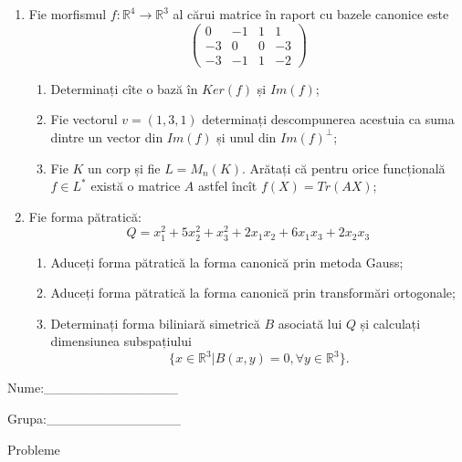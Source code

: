 \documentclass{article}
\begin{document}
\begin{enumerate}
 \item Fie morfismul $f:\mathbb{R}^4 \to \mathbb{R}^3$ al cărui matrice în raport cu bazele canonice este
$$\begin{pmatrix}
0&-1&1&1\\
-3&0&0&-3\\
-3&-1&1&-2
\end{pmatrix}$$

\begin{enumerate}
\item Determinați cîte o bază în $Ker(f)$ și $Im(f)$;
\item Fie vectorul $v=(1,3,1)$ determinați descompunerea acestuia ca suma dintre un vector din $Im(f)$ și unul din $Im(f)^\perp$;
\item Fie $K$ un corp și fie $L=M_n(K)$. Arătați că pentru orice funcțională $f \in L^*$ există o matrice $A$ astfel încît $f(X)=Tr(AX)$;
\end{enumerate}
\item Fie forma pătratică:
$$Q= x_1^2+5x_2^2+x_3^2+2x_1x_2+6x_1x_3+2x_2x_3$$

\begin{enumerate}
\item Aduceți forma pătratică la forma canonică prin metoda Gauss;
\item Aduceți forma pătratică la forma canonică prin transformări ortogonale;
\item Determinați forma biliniară simetrică $B$ asociată lui $Q$ și calculați dimensiunea subspațiului
$$\{x \in \mathbb{R}^3 | B(x,y)=0,\forall y \in \mathbb{R}^3\}.$$

\end{enumerate}
\end{enumerate}
\newpage
\begin{flushright}
Nume:\_\_\_\_\_\_\_\_\_\_\_\_\_\_
 
 
Grupa:\_\_\_\_\_\_\_\_\_\_\_\_\_\_
\end{flushright}
\begin{center}
\vspace{2cm}
{\Large Probleme}
\vspace{2cm}
\end{center}
\end{document}
